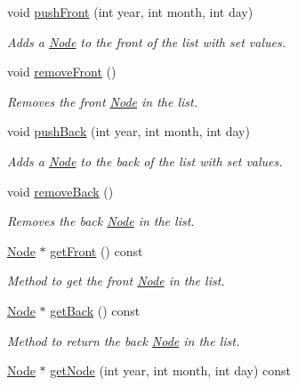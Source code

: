 \begin{DoxyCompactItemize}
void \hyperlink{class_double_linked_list_ae4d516bcfeea73b92b9cb927c3a157c7}{push\+Front} (int year, int month, int day)
\begin{DoxyCompactList}\small\item\em Adds a \hyperlink{class_node}{Node} to the front of the list with set values. \end{DoxyCompactList}\item 
void \hyperlink{class_double_linked_list_a436c04186fe23d797cae9f89eb1ae579}{remove\+Front} ()
\begin{DoxyCompactList}\small\item\em Removes the front \hyperlink{class_node}{Node} in the list. \end{DoxyCompactList}\item 
void \hyperlink{class_double_linked_list_a9f5ff04eb32e7fa3e37734754a98df80}{push\+Back} (int year, int month, int day)
\begin{DoxyCompactList}\small\item\em Adds a \hyperlink{class_node}{Node} to the back of the list with set values. \end{DoxyCompactList}\item 
void \hyperlink{class_double_linked_list_aa142f7151ffc4f93aa7e5fb111dbf356}{remove\+Back} ()
\begin{DoxyCompactList}\small\item\em Removes the back \hyperlink{class_node}{Node} in the list. \end{DoxyCompactList}\item 
\hyperlink{class_node}{Node} $\ast$ \hyperlink{class_double_linked_list_a9f32e3a5518aaddc4d16639d0d07726c}{get\+Front} () const
\begin{DoxyCompactList}\small\item\em Method to get the front \hyperlink{class_node}{Node} in the list. \end{DoxyCompactList}\item 
\hyperlink{class_node}{Node} $\ast$ \hyperlink{class_double_linked_list_a0b03a5a7cbdf78a0bcc6fce02e97d895}{get\+Back} () const
\begin{DoxyCompactList}\small\item\em Method to return the back \hyperlink{class_node}{Node} in the list. \end{DoxyCompactList}\item 
\hyperlink{class_node}{Node} $\ast$ \hyperlink{class_double_linked_list_a77b6120e0c3fe125b9228f4235fbc1f8}{get\+Node} (int year, int month, int day) const

\end{DoxyCompactItemize}
